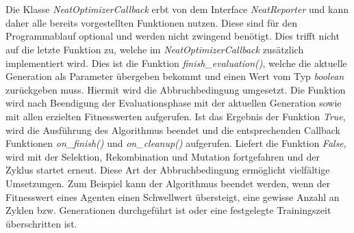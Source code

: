\\\\
Die Klasse \emph{NeatOptimizerCallback} erbt von dem Interface \emph{NeatReporter} und kann daher alle bereits vorgestellten Funktionen nutzen. Diese sind für den Programmablauf optional und werden nicht zwingend benötigt. Dies trifft nicht auf die letzte Funktion zu, welche im \emph{NeatOptimizerCallback} zusätzlich implementiert wird. Dies ist die Funktion \emph{finish\_evaluation()}, welche die aktuelle Generation als Parameter übergeben bekommt und einen Wert vom Typ \emph{boolean} zurückgeben muss. Hiermit wird die Abbruchbedingung umgesetzt. Die Funktion wird nach Beendigung der Evaluationsphase mit der aktuellen Generation sowie mit allen erzielten Fitnesswerten aufgerufen. Ist das Ergebnis der Funktion \emph{True}, wird die Ausführung des Algorithmus beendet und die entsprechenden Callback Funktionen \emph{on\_finish()} und \emph{on\_cleanup()} aufgerufen. Liefert die Funktion \emph{False}, wird mit der Selektion, Rekombination und Mutation fortgefahren und der Zyklus startet erneut. Diese Art der Abbruchbedingung ermöglicht vielfältige Umsetzungen. Zum Beispiel kann der Algorithmus beendet werden, wenn der Fitnesswert eines Agenten einen Schwellwert übersteigt, eine gewisse Anzahl an Zyklen bzw. Generationen durchgeführt ist oder eine festgelegte Trainingszeit überschritten ist.

